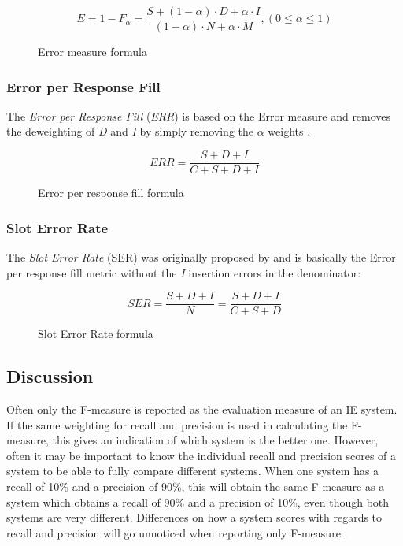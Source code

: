 \begin{figure}[H]
\begin{displaymath}
	E = 1 - F_\alpha = \frac{S + (1-\alpha) \cdot D + \alpha \cdot I}{(1-\alpha) \cdot N + \alpha \cdot M}, (0 \le \alpha \le 1)
\end{displaymath}
\caption{Error measure formula}
\label{eq:error-measure}
\end{figure}

\subsubsection{Error per Response Fill}
The \textit{Error per Response Fill} (\textit{ERR}) is based on the Error measure and removes the deweighting of \textit{D} and \textit{I} by simply removing the $\alpha$ weights \cite{Chinchor:1995}\cite{Makhoul:1999}.

\begin{figure}[H]
\begin{displaymath}
	ERR = \frac{S+D+I}{C+S+D+I}
\end{displaymath}
\caption{Error per response fill formula}
\label{eq:error-per-response-fill}
\end{figure}

\subsubsection{Slot Error Rate}
The \textit{Slot Error Rate} (SER) was originally proposed by \citeauthor{Makhoul:1999} \cite{Makhoul:1999} and is basically the Error per response fill metric without the \textit{I} insertion errors in the denominator:

\begin{figure}[H]
\begin{displaymath}
	SER = \frac{S+D+I}{N} = \frac{S+D+I}{C+S+D}
\end{displaymath}
\caption{Slot Error Rate formula}
\end{figure}

\subsection{Discussion}
Often only the F-measure is reported as the evaluation measure of an IE system. If the same weighting for recall and precision is used in calculating the F-measure, this gives an indication of which system is the better one. However, often it may be important to know the individual recall and precision scores of a system to be able to fully compare different systems. When one system has a recall of 10\% and a precision of 90\%, this will obtain the same F-measure as a system which obtains a recall of 90\% and a precision of 10\%, even though both systems are very different. Differences on how a system scores with regards to recall and precision will go unnoticed when reporting only F-measure \cite{Sitter:2004}.

